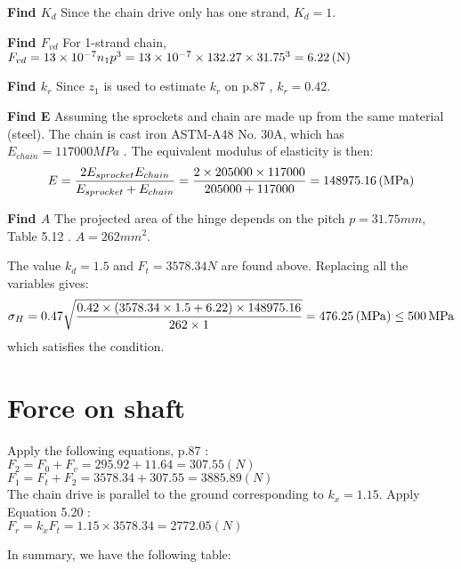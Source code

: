 \textbf{Find $ K_d $} Since the chain drive only has one strand, $ K_d = 1$.

\textbf{Find $ F_{vd} $} For 1-strand chain, $ F_{vd} = 13\times10^{-7}n_1p^3 = 13\times10^{-7} \times  132.27 \times 31.75^3 = 6.22 \, (\mathrm{N})$

\textbf{Find $ k_r $} Since $ z_1 $ is used to estimate $ k_r $ on p.87 \cite{tk1}, $ k_r= 0.42$.

\textbf{Find E} Assuming the sprockets and chain are made up from the same material (steel). The chain is cast iron ASTM-A48 No. 30A, which has $ E_{chain} = 117000 \unit{MPa} $ \cite{mott_vavrek_wang_2018}. The equivalent modulus of elasticity is then:
\[E = \dfrac{2E_{sprocket}E_{chain}}{E_{sprocket}+E_{chain}} = \dfrac{2\times 205000\times 117000}{205000 + 117000}= 148975.16 \, (\mathrm{MPa})\]

\textbf{Find $ A $} The projected area of the hinge depends on the pitch $ p=31.75\unit{mm} $, Table 5.12 \cite{tk1}. $ A = 262 \unit{mm^2} $.

The value $ k_d=1.5 $ and $ F_t =3578.34 \unit{N}$ are found above. Replacing all the variables gives:
\[\sigma_H = 0.47\sqrt{\dfrac{0.42\times(3578.34\times 1.5+ 6.22)\times148975.16}{262\times 1}} =  476.25 \, (\mathrm{MPa}) \leq 500 \, \mathrm{MPa}\]
which satisfies the condition.

\section{Force on shaft}
Apply the following equations, p.87 \cite{tk1}:\\
$ F_2 = F_0 + F_v = 295.92 + 11.64 = 307.55 \unit{(N)}$\\
$ F_1 = F_t + F_2 = 3578.34+307.55 = 3885.89 \unit{(N)}$\\
The chain drive is parallel to the ground corresponding to $ k_x=1.15 $. Apply Equation 5.20 \cite{tk1}:\\
$ F_r = k_xF_t = 1.15 \times 3578.34 = 2772.05\unit{(N)} $


In summary, we have the following table:

